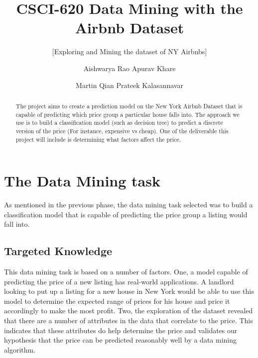 \documentclass{sig-alternate}
\begin{document}
	\title{CSCI-620 Data Mining with the Airbnb Dataset}
	\subtitle{[Exploring and Mining the dataset of NY Airbnbs]}
	
	\author
	{
		\alignauthor
		Aishwarya Rao
		\alignauthor
		Apurav Khare
		\and
		\alignauthor
		Martin Qian
		\alignauthor
		Prateek Kalasannavar
	}
	
	\maketitle
	\begin{abstract}
		
		The project aims to create a prediction model on the New York Airbnb Dataset that is capable of predicting which price group a particular house falls into. The approach we use is to build a classification model (such as decision tree) to predict a discrete version of the price (For instance, expensive vs cheap). One of the deliverable this project will include is determining what factors affect the price.   
		
	\end{abstract}

	
	\section{The Data Mining task}
	As mentioned in the previous phase, the data mining task selected was to build a classification model that is capable of predicting the price group a listing would fall into.
	
	\subsection{Targeted Knowledge}
	This data mining task is based on a number of factors. One, a model capable of predicting the price of a new listing has real-world applications. A landlord looking to put up a listing for a new house in New York would be able to use this model to determine the expected range of prices for his house and price it accordingly to make the most profit. Two, the exploration of the dataset revealed that there are a number of attributes in the data that correlate to the price. This indicates that these attributes do help determine the price and validates our hypothesis that the price can be predicted reasonably well by a data mining algorithm. 
	
\end{document}
